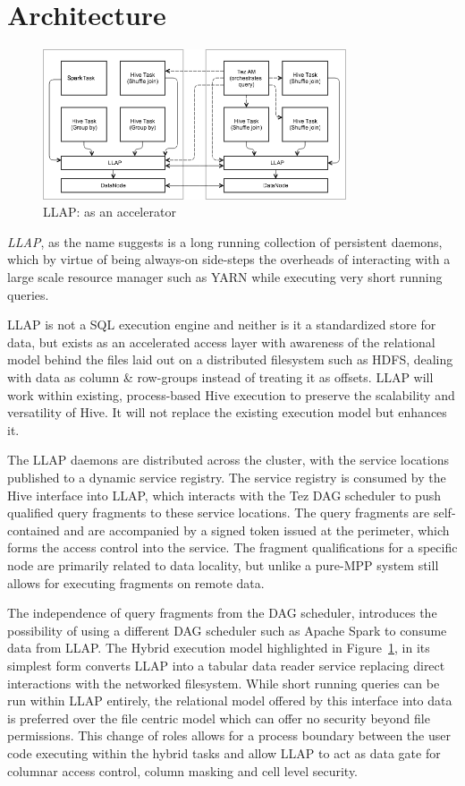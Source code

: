 \section{Architecture}

\begin{figure}[ht]
\centering
\includegraphics[width=0.8\textwidth]{figures/arch1.png}
\caption{LLAP: as an accelerator}
\label{fig:arch1}
\end{figure} 


\emph{LLAP}, as the name suggests is a long running collection of persistent daemons, which by virtue of being always-on side-steps the
overheads of interacting with a large scale resource manager such as YARN\cite{YARN} while executing very short running queries. 

LLAP is not a SQL execution engine and neither is it a standardized store for data, but exists as an accelerated access layer with awareness of the relational
model behind the files laid out on a distributed filesystem such as HDFS, dealing with data as column \& row-groups instead of treating it as offsets. LLAP will work
within existing, process-based Hive execution to preserve the scalability and versatility of Hive.  It will not replace the existing execution model but enhances it.

The LLAP daemons are distributed across the cluster, with the service locations published to a dynamic service registry. The service registry is consumed by the 
Hive interface into LLAP, which interacts with the Tez DAG scheduler to push qualified query fragments to these service locations. The query fragments are self-contained
and are accompanied by a signed token issued at the perimeter, which forms the access control into the service. The fragment qualifications for a specific node are
primarily related to data locality, but unlike a pure-MPP system still allows for executing fragments on remote data. 

The independence of query fragments from the DAG scheduler, introduces the possibility of using a different DAG scheduler such as Apache Spark
to consume data from LLAP. The Hybrid execution model highlighted in Figure~\ref{fig:arch1}, in its simplest form 
converts LLAP into a tabular data reader service replacing direct interactions with the networked filesystem. While short running queries
can be run within LLAP entirely, the relational model offered by this interface into data is preferred over the file centric model which
can offer no security beyond file permissions. This change of roles allows for a process boundary between the user code executing within the 
hybrid tasks and allow LLAP to act as data gate for columnar access control, column masking and cell level security.

